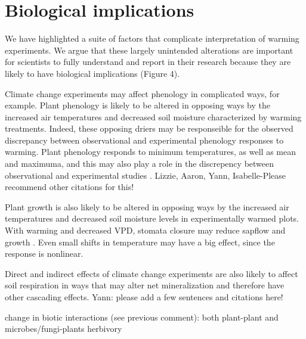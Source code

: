 \documentclass{article}
\begin{document}
\section* {Biological implications}
\par We have highlighted a suite of factors that complicate   interpretation of warming experiments. We argue that these largely unintended alterations are important for scientists to fully understand and report in their research because they are likely to have biological implications (Figure 4).
\par Climate change experiments may affect phenology in complicated ways, for example. Plant phenology is likely to be altered in opposing ways by the increased air temperatures and decreased soil moisture characterized by warming treatments. Indeed, these opposing driers may be responseible for the observed discrepancy between observational and experimental phenology responses to warming\citep{wolkovich2012}. Plant phenology responds to minimum temperatures, as well as mean and maximuma, and this may also play a role in the discrepency between observational and experimental studies \citep{shen2016,matthews2016}. Lizzie, Aaron, Yann, Isabelle-Please recommend other citations for this!
\par Plant growth is also likely to be altered in opposing ways by the increased air temperatures and decreased soil moisture levels in experimentally warmed plots. With warming and decreased VPD, stomata closure may reduce sapflow and growth \citep{templer2016}. Even small shifts in temperature may have a big effect, since the response is nonlinear.
\par Direct and indirect effects of climate change experiments are also likely to affect soil respiration in ways that may alter net mineralization and therefore have other cascading effects. Yann: please add a few sentences and citations here!

\par change in biotic interactions (see previous comment): both plant-plant and microbes/fungi-plants herbivory
\end{document}
